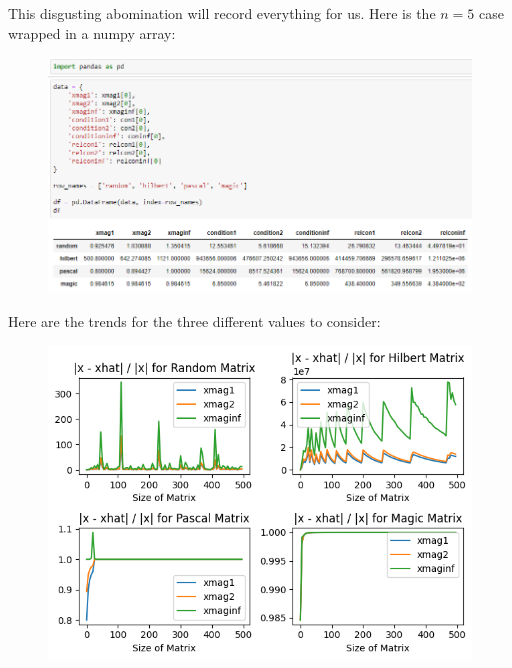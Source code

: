\begin{solution}
 This disgusting abomination will record everything for us. Here is the $n = 5$ case wrapped in a numpy array:

 \begin{figure}[h]
     \centering
     \includegraphics[width = \textwidth]{Images/dataframe.png}
     \label{p5c: dataframe}
 \end{figure}

 Here are the trends for the three different values to consider:

 \begin{figure}
     \centering
     \includegraphics{Images/mags.png}
     \label{fig:xhats}
 \end{figure}


\end{solution}
